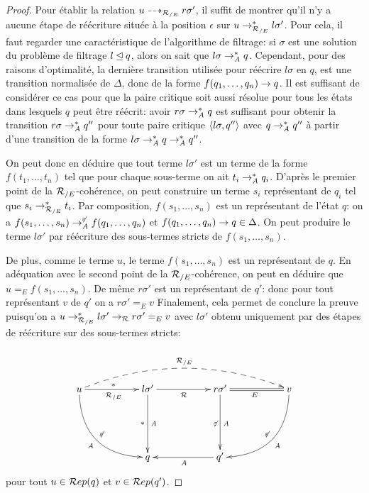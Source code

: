\begin{proof}
  Pour établir la relation $u \dashrightarrow_{\mathcal R_{/E}} r\sigma'$, il
  suffit de montrer qu'il n'y a aucune étape de réécriture située à la
  position $\epsilon$ sur $u \rightarrow_{\mathcal R_{/E}}^* l\sigma'$.  Pour cela, il faut
  regarder une caractéristique de l'algorithme de filtrage: si
  $\sigma$ est une solution du problème de filtrage $l \unlhd q$,
  alors on sait que $l\sigma \rightarrow_\mathit A^* q$.  Cependant, pour des raisons
  d'optimalité, la dernière transition utilisée pour réécrire
  $l\sigma$ en $q$, est une transition normalisée de $\Delta$, donc de
  la forme $f(q_1,\dots, q_n) \rightarrow q$.  Il est suffisant de considérer
  ce cas pour que la paire critique soit aussi résolue pour tous les
  états dans lesquels $q$ peut être réécrit: avoir $r\sigma \rightarrow_\mathit A^*
  q$ est suffisant pour obtenir la transition $r\sigma \rightarrow_{\mathit A}^* q''$
  pour toute paire critique $\langle l\sigma, q'' \rangle$ avec $q \rightarrow_{\mathit A}^*
  q''$ à partir d'une transition de la forme $l\sigma \rightarrow^*_{\mathit A} q
  \rightarrow^*_\mathit A q''$.
  
  On peut donc en déduire que tout terme $l\sigma'$ est un terme de la forme $f(t_1, \dots, t_n)$ tel que 
  pour chaque sous-terme on ait $t_i \rightarrow_\mathit A^* q_i$. D'après le premier point de la ${\mathcal R_{/E}}$-cohérence,
  on peut construire un terme $s_i$ représentant de $q_i$ tel que $s_i \rightarrow_{\mathcal R_{/E}}^* t_i$. 
  Par composition, $f(s_1, \dots, s_n)$ est un représentant de l'état $q$:
  on a $ f(s_1,\dots, s_n) \rightarrow^{\not\varepsilon}_\mathit A f(q_1,\dots, q_n)$ et $f(q_1,\dots, q_n) \rightarrow q \in \Delta$.
  On peut produire le terme $l\sigma'$ par réécriture des sous-termes stricts de $f(s_1, \dots, s_n)$.

  De plus, comme le terme $u$, le terme $f(s_1, \dots, s_n)$ est un représentant de $q$. En adéquation
  avec le second point de la ${\mathcal R_{/E}}$-cohérence, on peut en déduire que $u =_E f(s_1, \dots, s_n)$.
  De même $r\sigma'$ est un représentant de $q'$: donc pour tout représentant $v$ de $q'$ on a $r\sigma' =_E v$
  Finalement, cela permet de conclure la preuve puisqu'on a $u \rightarrow_{\mathcal R_{/E}}^* l\sigma' \rightarrow_\mathcal R r\sigma' =_E v$
  avec $l\sigma'$ obtenu uniquement par des étapes de réécriture sur des sous-termes stricts:

  \[
  \xymatrix{
    &&&&&\\
    u \ar@/_2pc/[rrdd]^{\not\varepsilon}_{\A} \ar[rr]_{\RE}^{*} \ar @/^1.8pc/ @{-->} [rrrrrr]^{\RE} &&
    l\sigma' \ar[dd]^{\A}_{*} \ar[rr]_{\R}&&
    r\sigma' \ar[dd]^{\A}_{\not\varepsilon} && v \ar@{=}[ll]^{E} \ar@/^2pc/[lldd]_{\not\varepsilon}^{\A}\\
    &&&&&\\
    && q && q' \ar[ll]^{\A} &
  }
  \]
  \noindent
  pour tout $u \in \mathcal R ep(q)$ et $v \in \mathcal R ep(q')$.
\end{proof}


